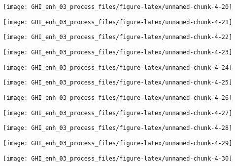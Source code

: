 \documentclass[
  10pt,
  a4paper,oneside]{article}
\begin{document}
\begin{center}\texttt{[image: GHI\_enh\_03\_process\_files/figure-latex/unnamed-chunk-4-20]} \end{center}

\begin{center}\texttt{[image: GHI\_enh\_03\_process\_files/figure-latex/unnamed-chunk-4-21]} \end{center}

\begin{center}\texttt{[image: GHI\_enh\_03\_process\_files/figure-latex/unnamed-chunk-4-22]} \end{center}

\begin{center}\texttt{[image: GHI\_enh\_03\_process\_files/figure-latex/unnamed-chunk-4-23]} \end{center}

\begin{center}\texttt{[image: GHI\_enh\_03\_process\_files/figure-latex/unnamed-chunk-4-24]} \end{center}

\begin{center}\texttt{[image: GHI\_enh\_03\_process\_files/figure-latex/unnamed-chunk-4-25]} \end{center}

\begin{center}\texttt{[image: GHI\_enh\_03\_process\_files/figure-latex/unnamed-chunk-4-26]} \end{center}

\begin{center}\texttt{[image: GHI\_enh\_03\_process\_files/figure-latex/unnamed-chunk-4-27]} \end{center}

\begin{center}\texttt{[image: GHI\_enh\_03\_process\_files/figure-latex/unnamed-chunk-4-28]} \end{center}

\begin{center}\texttt{[image: GHI\_enh\_03\_process\_files/figure-latex/unnamed-chunk-4-29]} \end{center}

\begin{center}\texttt{[image: GHI\_enh\_03\_process\_files/figure-latex/unnamed-chunk-4-30]} \end{center}
\end{document}
